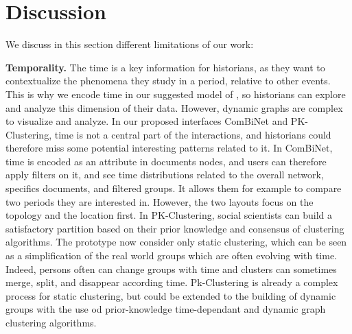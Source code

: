 \section{Discussion}\label{sec:discussion}

We discuss in this section different limitations of our work:

\noindent\textbf{Temporality.} The time is a key information for historians, as they want to contextualize the phenomena they study in a period, relative to other events.
This is why we encode time in our suggested model of \modelplural, so historians can explore and analyze this dimension of their data.
However, dynamic graphs are complex to visualize and analyze.
In our proposed interfaces ComBiNet and PK-Clustering, time is not a central part of the interactions, and historians could therefore miss some potential interesting patterns related to it.
In ComBiNet, time is encoded as an attribute in documents nodes, and users can therefore apply filters on it, and see time distributions related to the overall network, specifics documents, and filtered groups.
It allows them for example to compare two periods they are interested in.
However, the two layouts focus on the topology and the location first.
In PK-Clustering, social scientists can build a satisfactory partition based on their prior knowledge and consensus of clustering algorithms.
The prototype now consider only static clustering, which can be seen as a simplification of the real world groups which are often evolving with time.
Indeed, persons often can change groups with time and clusters can sometimes merge, split, and disappear according time.
Pk-Clustering is already a complex process for static clustering, but could be extended to the building of dynamic groups with the use od prior-knowledge time-dependant and dynamic graph clustering algorithms.




